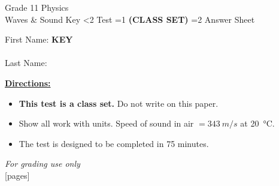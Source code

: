 \documentclass[addpoints]{exam}
\newcommand{\event}{Waves \& Sound}
\newcommand{\tournament}{}
\def\type{0}
\begin{document}
\begin{center}
    {\huge Grade 11 Physics \\ \event
    \ifprintanswers \space Key
    \else \space \ifnum\type<2 Test \fi \ifnum\type=1 \textbf{(CLASS SET)} \fi
          \ifnum\type=2 Answer Sheet \fi
    \fi \\ \vspace{3mm}\tournament\vspace{1mm}}
\end{center}

\vspace{.25\textheight}

\begin{center}
    First Name: \ifprintanswers
    \underline{\hspace{3.5cm}}\textbf{KEY}\underline{\hspace{5.5cm}}\\\vspace{5mm}
    \else \underline{\hspace{10cm}}\\ \vspace{5mm} \fi
    Last Name: \underline{\hspace{10cm}}\\ \vspace{5mm}
\end{center}

\noindent\textbf{\underline{Directions:}}
\begin{itemize}
    \ifnum\type=1 \item \textbf{This test is a class set.} Do not write on this paper. \fi
    \item Show all work with units. Speed of sound in air $= \SI{343}{m/s}$ at \SI{20}{\celsius}.
    \item The test is designed to be completed in 75 minutes.
\end{itemize}
\begin{center}
\textit{For grading use only}\\
[pages]
\end{center}
\end{document}
